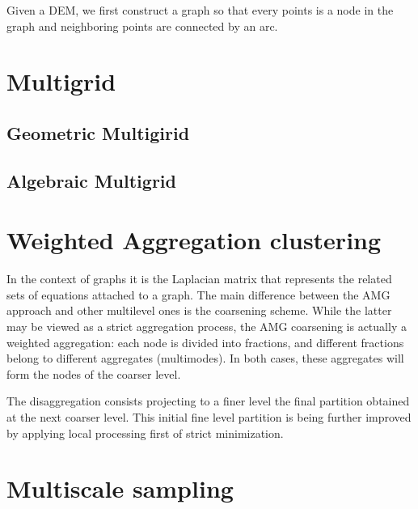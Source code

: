 \documentclass[12pt,letterpaper]{article}
\begin{document}
Given a DEM, we first construct a graph so that every points is a node in the graph and neighboring points are connected by an arc.


\section{Multigrid}

\subsection{Geometric Multigirid}

\subsection{Algebraic Multigrid}

\section{Weighted Aggregation clustering}
In the context of graphs it is the Laplacian matrix that represents the related sets of equations attached to a graph. The main difference between the AMG approach and other multilevel ones is the coarsening scheme. While the latter may be viewed as a strict aggregation process, the AMG coarsening is actually a weighted aggregation: each node is divided into fractions, and different fractions belong to different aggregates (multimodes). In both cases, these aggregates will form the nodes of the coarser level. 

The disaggregation consists projecting to a finer level the final partition obtained at the next coarser level. This initial fine level partition is being further improved by applying local processing first of strict minimization. 


\section{Multiscale sampling}
\end{document}

